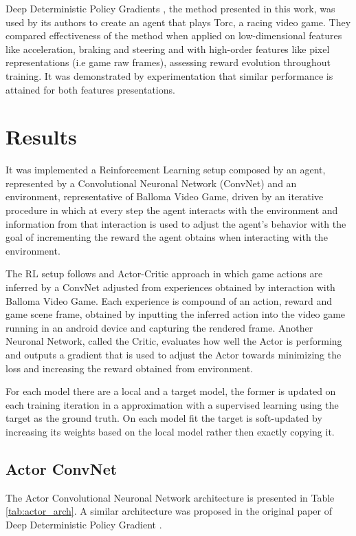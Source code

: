 \documentclass[peerreview,onecolumn]{IEEEtran}
\begin{document}
	  Deep Deterministic Policy Gradients \cite{ddpg_2015}, the method presented in this work, was used by its authors to create an agent that plays Torc, a racing video game. They compared effectiveness of the method when applied on low-dimensional features like acceleration, braking and steering and with high-order features like pixel representations (i.e game raw frames), assessing reward evolution throughout training. It was demonstrated by experimentation that similar performance is attained for both features presentations.
	  
	  \section{Results}
	  
	  It was implemented a Reinforcement Learning setup composed by an agent, represented by a Convolutional Neuronal Network (ConvNet) and an environment, representative of Balloma Video Game, driven by an iterative procedure in which at every step the agent interacts with the environment and information from that interaction is used to adjust the agent's behavior with the goal of incrementing the reward the agent obtains when interacting with the environment. 
	  
	 The RL setup follows and Actor-Critic approach in which game actions are inferred by a ConvNet adjusted from experiences obtained by interaction with Balloma Video Game. Each experience is compound of an action, reward and game scene frame, obtained by inputting the inferred action into the video game running in an android device and capturing the rendered frame. Another Neuronal Network, called the Critic, evaluates how well the Actor is performing and outputs a gradient that is used to adjust the Actor towards minimizing the loss and increasing the reward obtained from environment.
	 
	 For each model there are a local and a target model, the former is updated on each training iteration in a approximation with a supervised learning using the target as the ground truth. On each model fit the target is soft-updated by increasing its weights based on the local model rather then exactly copying it.
	 
	 \subsection{Actor ConvNet}
	 
	 The Actor Convolutional Neuronal Network architecture is presented in Table \ref{tab:actor_arch}. A similar architecture was proposed in the original paper of Deep Deterministic Policy Gradient \cite{ddpg_2015}. 
	 
\end{document}
